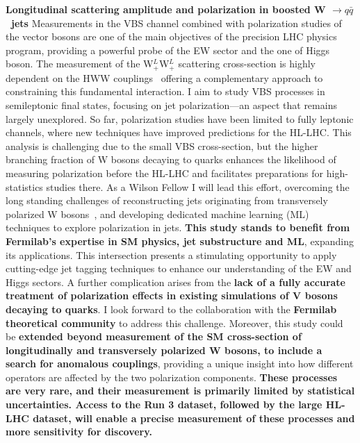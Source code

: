 {\begin{flushleft}
\textbf{Longitudinal scattering amplitude and polarization in boosted W $\to q\bar{q}$ \ jets}
Measurements in the VBS channel combined with polarization studies of the vector bosons are one of the main objectives of the precision LHC physics program, providing a powerful probe of the EW sector and the one of Higgs boson.
The measurement of the  W$^L_+$W$^L_+$ scattering cross-section is highly dependent on the HWW couplings~\cite{[3]} offering a complementary approach to constraining this fundamental interaction.
I aim to study VBS processes in semileptonic final states, focusing on jet polarization—an aspect that remains largely unexplored. So far, polarization studies have been limited to fully leptonic channels, where new techniques have improved predictions for the HL-LHC. This analysis is challenging due to the small VBS cross-section, but the higher branching fraction of W bosons decaying to quarks enhances the likelihood of measuring polarization before the HL-LHC and facilitates preparations for high-statistics studies there. As a Wilson Fellow I will lead this effort, overcoming the long standing challenges of reconstructing jets originating from transversely polarized W bosons~\cite{[4]}, and developing dedicated machine learning (ML) techniques to explore polarization in jets.
\textbf{This study stands to benefit from Fermilab’s expertise in SM physics, jet substructure and ML}, expanding its applications. This intersection presents a stimulating opportunity to apply cutting-edge jet tagging techniques to enhance our understanding of the EW and Higgs sectors.
A further complication arises from the {\bf lack of a fully accurate treatment of polarization effects in existing simulations of V bosons decaying to quarks}. I look forward to the collaboration with the {\bf Fermilab theoretical community} to address this challenge.  
Moreover, this study could be {\bf extended beyond measurement of the SM cross-section of longitudinally and transversely polarized W bosons, to include a search for anomalous couplings}, providing a unique insight into how different operators are affected by the two polarization components.
{\bf These processes are very rare, and their measurement is primarily limited by statistical uncertainties. Access to the Run 3 dataset, followed by the large HL-LHC dataset, will enable a precise measurement of these processes and more sensitivity for discovery.}


\end{flushleft}}
